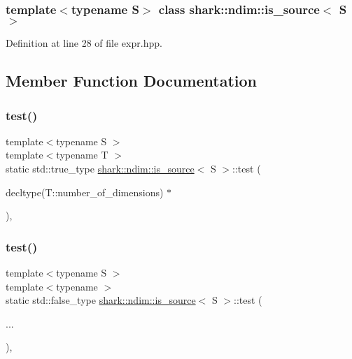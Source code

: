 \subsubsection*{template$<$typename S$>$\newline
class shark\+::ndim\+::is\+\_\+source$<$ S $>$}



Definition at line 28 of file expr.\+hpp.



\subsection{Member Function Documentation}
\hypertarget{classshark_1_1ndim_1_1is__source_a3aae092d2fe4e1593d3997fa4c33c27b}{}\label{classshark_1_1ndim_1_1is__source_a3aae092d2fe4e1593d3997fa4c33c27b} 
\subsubsection{\texorpdfstring{test()}{test()}\hspace{0.1cm}{\footnotesize\ttfamily [1/2]}}
{\footnotesize\ttfamily template$<$typename S $>$ \\
template$<$typename T $>$ \\
static std\+::true\+\_\+type \hyperlink{classshark_1_1ndim_1_1is__source}{shark\+::ndim\+::is\+\_\+source}$<$ S $>$\+::test (\begin{DoxyParamCaption}\item[{decltype(T\+::number\+\_\+of\+\_\+dimensions) $\ast$}]{ }\end{DoxyParamCaption})\hspace{0.3cm}{\ttfamily [static]}, {\ttfamily [private]}}

\hypertarget{classshark_1_1ndim_1_1is__source_a43983e36462efe2c8ff1a5be7e1b30af}{}\label{classshark_1_1ndim_1_1is__source_a43983e36462efe2c8ff1a5be7e1b30af} 
\subsubsection{\texorpdfstring{test()}{test()}\hspace{0.1cm}{\footnotesize\ttfamily [2/2]}}
{\footnotesize\ttfamily template$<$typename S $>$ \\
template$<$typename $>$ \\
static std\+::false\+\_\+type \hyperlink{classshark_1_1ndim_1_1is__source}{shark\+::ndim\+::is\+\_\+source}$<$ S $>$\+::test (\begin{DoxyParamCaption}\item[{}]{... }\end{DoxyParamCaption})\hspace{0.3cm}{\ttfamily [static]}, {\ttfamily [private]}}



